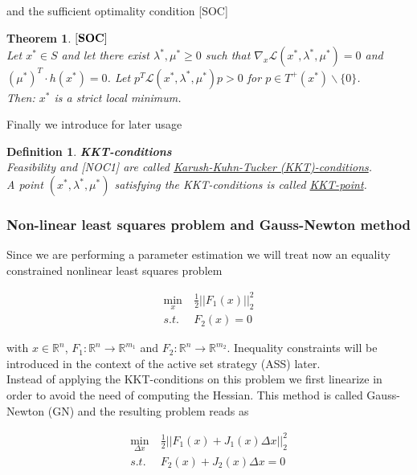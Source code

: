\documentclass{scrartcl}[12pt, halfparskip]
\numberwithin{equation}{section}
\numberwithin{figure}{section}
\numberwithin{table}{section}
\newtheorem{Definition}{Definition}
\newtheorem{Theorem}{Theorem}
\begin{document}
and the sufficient optimality condition [SOC]

\begin{Theorem}
	$[\text{\textbf{SOC}}]$ \\
	Let $x^* \in S$ and let there exist $\lambda^*, \mu^* \ge 0$ such that $\nabla_x \mathcal{L}(x^*, \lambda^*, \mu^*) = 0$ and \\ $(\mu^*)^T \cdot h(x^*) = 0$. 
	Let $p^T \mathcal{L}(x^*, \lambda^*, \mu^*) p > 0$ for $p \in T^+(x^*) \backslash \{0\}$. \\
	Then: $x^*$ is a strict local minimum.
\end{Theorem}

Finally we introduce for later usage 

\begin{Definition} \textbf{KKT-conditions} \\
	Feasibility and [NOC1] are called \underline{Karush-Kuhn-Tucker (KKT)-conditions}. \\
	A point $(x^*, \lambda^*, \mu^*)$ satisfying the KKT-conditions is called \underline{KKT-point}.
\end{Definition}


\subsubsection{Non-linear least squares problem and Gauss-Newton method}
\label{sec:Gauss_Newton}
Since we are performing a parameter estimation we will treat now an equality constrained nonlinear least squares problem

\begin{align}
	\min_x \ & \frac{1}{2}|| F_1(x) ||_2^2 \\
	s.t. \ & F_2(x) = 0 \nonumber
\end{align}

with $x \in \mathbb{R}^n$, $F_1: \mathbb{R}^n \rightarrow \mathbb{R}^{m_1}$ and $F_2: \mathbb{R}^n \rightarrow \mathbb{R}^{m_2}$. Inequality constraints will be introduced in the context of the active set strategy (ASS) later. \\
Instead of applying the KKT-conditions on this problem we first linearize in order to avoid the need of computing the Hessian. This method is called Gauss-Newton (GN) and the resulting problem reads as

\begin{align}
\min_{\Delta x} \ & \frac{1}{2}|| F_1(x) + J_1(x) \Delta x ||_2^2 \\
s.t. \ & F_2(x) + J_2(x) \Delta x = 0 \nonumber
\end{align}
\end{document}
